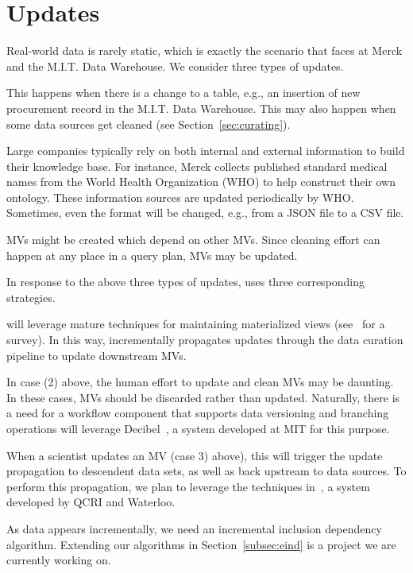 \section{Updates}
\label{sec:updates}

Real-world data is rarely static, which is exactly the scenario that \dcv faces at Merck and the M.I.T. Data Warehouse.  We consider three types of updates.

 This happens when there is a change to a table, e.g., an insertion of new procurement record in the M.I.T. Data Warehouse. This may also happen when some data sources get cleaned (see Section~\ref{sec:curating}).



 Large companies typically rely on both internal and external information to build their knowledge base. For instance, Merck collects published standard medical names from the World Health Organization (WHO) to help construct their own ontology. These information sources are updated periodically by WHO.  Sometimes, even the format will be changed, e.g., from a JSON file to a CSV file.



 MVs might be created which depend on other MVs.  Since cleaning effort can happen at any place in a query plan, MVs may be updated.



In response to the above three types of updates, \dcv uses three corresponding strategies.



 \dcv will leverage mature techniques for maintaining materialized views (see~\cite{DBLP:journals/debu/GuptaM95} for a survey).  In this way, \dcv incrementally propagates updates through the data curation pipeline to update downstream MVs.




  In case (2) above, the human effort to update and clean MVs may be daunting. In these cases, MVs should be discarded rather than updated. Naturally, there is a need for a workflow component that supports data versioning and branching operations \dcv will leverage Decibel~\cite{DBLP:journals/pvldb/MaddoxGEMPD16}, a system developed at MIT for this purpose.




 When a scientist updates an MV (case 3) above), this will trigger the update propagation to descendent data sets, as well as back upstream to data sources. To perform this propagation, we plan to leverage the techniques in~\cite{DBLP:conf/sigmod/ChalamallaIOP14}, a system developed by QCRI and Waterloo.


As data appears incrementally, we need an incremental inclusion dependency algorithm. Extending our algorithms in Section~\ref{subsec:eind} is a project we are currently working on.

